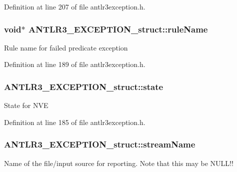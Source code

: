 Definition at line 207 of file antlr3exception.\-h.

\hypertarget{struct_a_n_t_l_r3___e_x_c_e_p_t_i_o_n__struct_ae3d3014a069b29bef5d45f3861921c21}{
\subsubsection[{rule\-Name}]{\setlength{\rightskip}{0pt plus 5cm}void$\ast$ A\-N\-T\-L\-R3\-\_\-\-E\-X\-C\-E\-P\-T\-I\-O\-N\-\_\-struct\-::rule\-Name}}\label{struct_a_n_t_l_r3___e_x_c_e_p_t_i_o_n__struct_ae3d3014a069b29bef5d45f3861921c21}
Rule name for failed predicate exception 

Definition at line 189 of file antlr3exception.\-h.

\hypertarget{struct_a_n_t_l_r3___e_x_c_e_p_t_i_o_n__struct_a6161406e61e64bccc6d97bd0230231d7}{
\subsubsection[{state}]{ A\-N\-T\-L\-R3\-\_\-\-E\-X\-C\-E\-P\-T\-I\-O\-N\-\_\-struct\-::state}}\label{struct_a_n_t_l_r3___e_x_c_e_p_t_i_o_n__struct_a6161406e61e64bccc6d97bd0230231d7}
State for N\-V\-E 

Definition at line 185 of file antlr3exception.\-h.

\hypertarget{struct_a_n_t_l_r3___e_x_c_e_p_t_i_o_n__struct_a013938c3f88ca1487710dc9b515d5ca3}{
\subsubsection[{stream\-Name}]{ A\-N\-T\-L\-R3\-\_\-\-E\-X\-C\-E\-P\-T\-I\-O\-N\-\_\-struct\-::stream\-Name}}\label{struct_a_n_t_l_r3___e_x_c_e_p_t_i_o_n__struct_a013938c3f88ca1487710dc9b515d5ca3}
Name of the file/input source for reporting. Note that this may be N\-U\-L\-L!! 

